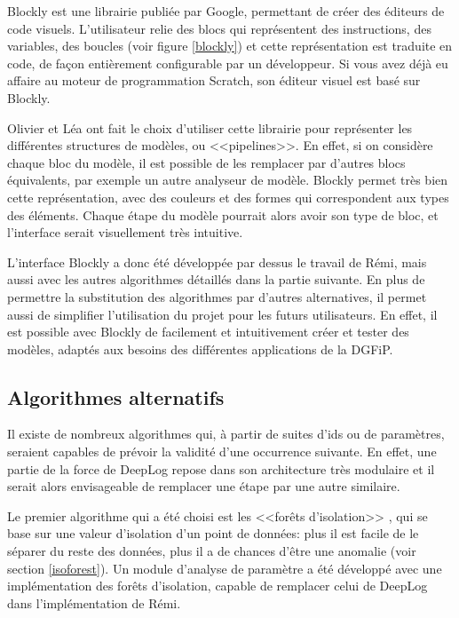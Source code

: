 \documentclass[openany, 11pt]{memoir}
\begin{document}
Blockly est une librairie publiée par Google, permettant de créer des éditeurs de code visuels. L'utilisateur relie des blocs qui représentent des instructions, des variables, des boucles (voir figure \ref{blockly}) et cette représentation est traduite en code, de façon entièrement configurable par un développeur. Si vous avez déjà eu affaire au moteur de programmation Scratch, son éditeur visuel est basé sur Blockly.

\bigskip
Olivier et Léa ont fait le choix d'utiliser cette librairie pour représenter les différentes structures de modèles, ou <<pipelines>>. En effet, si on considère chaque bloc du modèle, il est possible de les remplacer par d'autres blocs équivalents, par exemple un autre analyseur de modèle. Blockly permet très bien cette représentation, avec des couleurs et des formes qui correspondent aux types des éléments. Chaque étape du modèle pourrait alors avoir son type de bloc, et l'interface serait visuellement très intuitive.

L'interface Blockly a donc été développée par dessus le travail de Rémi, mais aussi avec les autres algorithmes détaillés dans la partie suivante. En plus de permettre la substitution des algorithmes par d'autres alternatives, il permet aussi de simplifier l'utilisation du projet pour les futurs utilisateurs. En effet, il est possible avec Blockly de facilement et intuitivement créer et tester des modèles, adaptés aux besoins des différentes applications de la \gls{DGFiP}.

\subsection{Algorithmes alternatifs}

Il existe de nombreux algorithmes qui, à partir de suites d'ids ou de paramètres, seraient capables de prévoir la validité d'une occurrence suivante. En effet, une partie de la force de DeepLog repose dans son architecture très modulaire et il serait alors envisageable de remplacer une étape par une autre similaire.

Le premier algorithme qui a été choisi est les <<forêts d'isolation>> \cite{isolationforest}, qui se base sur une valeur d'isolation d'un point de données: plus il est facile de le séparer du reste des données, plus il a de chances d'être une anomalie (voir section \ref{isoforest}). Un module d'analyse de paramètre a été développé avec une implémentation des forêts d'isolation, capable de remplacer celui de DeepLog dans l'implémentation de Rémi.
\end{document}
